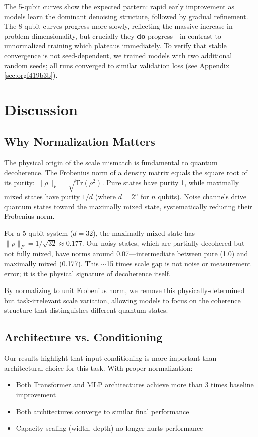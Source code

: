 \documentclass[11pt]{article}
\begin{document}
The 5-qubit curves show the expected pattern: rapid early improvement as models learn the dominant denoising structure, followed by gradual refinement. The 8-qubit curves progress more slowly, reflecting the massive increase in problem dimensionality, but crucially they \textbf{do} progress---in contrast to unnormalized training which plateaus immediately. To verify that stable convergence is not seed-dependent, we trained models with two additional random seeds; all runs converged to similar validation loss (see Appendix \ref{sec:orgf419b3b}).
\section{Discussion}
\label{sec:org9f8e201}

\subsection{Why Normalization Matters}
\label{sec:org9c39931}

The physical origin of the scale mismatch is fundamental to quantum decoherence. The Frobenius norm of a density matrix equals the square root of its purity: \(\|\rho\|_F = \sqrt{\mathrm{Tr}(\rho^2)}\). Pure states have purity 1, while maximally mixed states have purity \(1/d\) (where \(d = 2^n\) for \(n\) qubits). Noise channels drive quantum states toward the maximally mixed state, systematically reducing their Frobenius norm.

For a 5-qubit system (\(d = 32\)), the maximally mixed state has \(\|\rho\|_F = 1/\sqrt{32} \approx 0.177\). Our noisy states, which are partially decohered but not fully mixed, have norms around 0.07---intermediate between pure (1.0) and maximally mixed (0.177). This \(\sim\)15 times scale gap is not noise or measurement error; it is the physical signature of decoherence itself.

By normalizing to unit Frobenius norm, we remove this physically-determined but task-irrelevant scale variation, allowing models to focus on the coherence structure that distinguishes different quantum states.
\subsection{Architecture vs. Conditioning}
\label{sec:orgd3fde0c}

Our results highlight that input conditioning is more important than architectural choice for this task. With proper normalization:
\begin{itemize}
\item Both Transformer and MLP architectures achieve more than 3 times baseline improvement
\item Both architectures converge to similar final performance
\item Capacity scaling (width, depth) no longer hurts performance
\end{itemize}
\end{document}
